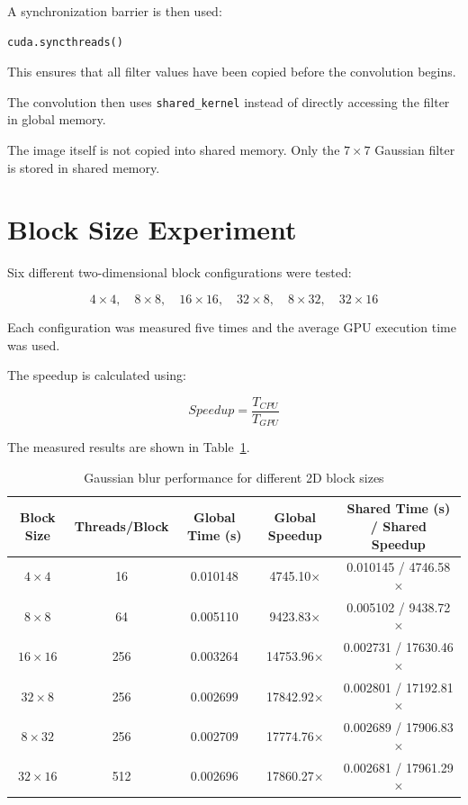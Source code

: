 \documentclass[11pt]{article}
\begin{document}
A synchronization barrier is then used:

\begin{verbatim}
cuda.syncthreads()
\end{verbatim}

This ensures that all filter values have been copied before the
convolution begins.

The convolution then uses \texttt{shared\_kernel} instead of directly
accessing the filter in global memory.

The image itself is not copied into shared memory. Only the $7\times7$
Gaussian filter is stored in shared memory.

\section{Block Size Experiment}

Six different two-dimensional block configurations were tested:

\[
4\times4,\quad
8\times8,\quad
16\times16,\quad
32\times8,\quad
8\times32,\quad
32\times16
\]

Each configuration was measured five times and the average GPU execution
time was used.

The speedup is calculated using:

\[
Speedup =
\frac{T_{CPU}}{T_{GPU}}
\]

The measured results are shown in Table~\ref{tab:block-results}.

\begin{table}[H]
    \centering
    \caption{Gaussian blur performance for different 2D block sizes}
    \label{tab:block-results}
    \begin{tabular}{c c c c c}
        \toprule
        Block Size &
        Threads/Block &
        Global Time (s) &
        Global Speedup &
        Shared Time (s) /
        Shared Speedup \\
        \midrule
        $4\times4$ &
        16 &
        0.010148 &
        4745.10$\times$ &
        0.010145 / 4746.58$\times$ \\

        $8\times8$ &
        64 &
        0.005110 &
        9423.83$\times$ &
        0.005102 / 9438.72$\times$ \\

        $16\times16$ &
        256 &
        0.003264 &
        14753.96$\times$ &
        0.002731 / 17630.46$\times$ \\

        $32\times8$ &
        256 &
        0.002699 &
        17842.92$\times$ &
        0.002801 / 17192.81$\times$ \\

        $8\times32$ &
        256 &
        0.002709 &
        17774.76$\times$ &
        0.002689 / 17906.83$\times$ \\

        $32\times16$ &
        512 &
        0.002696 &
        17860.27$\times$ &
        0.002681 / 17961.29$\times$ \\

        \bottomrule
    \end{tabular}
\end{table}
\end{document}
